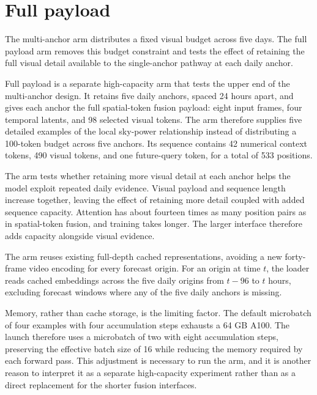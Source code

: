\section{Full payload}

The multi-anchor arm distributes a fixed visual budget across five days. The full payload arm removes this budget constraint and tests the effect of retaining the full visual detail available to the single-anchor pathway at each daily anchor.

Full payload is a separate high-capacity arm that tests the upper end of the multi-anchor design. It retains five daily anchors, spaced 24 hours apart, and gives each anchor the full spatial-token fusion payload: eight input frames, four temporal latents, and 98 selected visual tokens. The arm therefore supplies five detailed examples of the local sky-power relationship instead of distributing a 100-token budget across five anchors. Its sequence contains 42 numerical context tokens, 490 visual tokens, and one future-query token, for a total of 533 positions.

The arm tests whether retaining more visual detail at each anchor helps the model exploit repeated daily evidence. Visual payload and sequence length increase together, leaving the effect of retaining more detail coupled with added sequence capacity. Attention has about fourteen times as many position pairs as in spatial-token fusion, and training takes longer. The larger interface therefore adds capacity alongside visual evidence.

The arm reuses existing full-depth cached representations, avoiding a new forty-frame video encoding for every forecast origin. For an origin at time $t$, the loader reads cached embeddings across the five daily origins from $t-96$ to $t$ hours, excluding forecast windows where any of the five daily anchors is missing.

Memory, rather than cache storage, is the limiting factor. The default microbatch of four examples with four accumulation steps exhausts a 64 GB A100. The launch therefore uses a microbatch of two with eight accumulation steps, preserving the effective batch size of 16 while reducing the memory required by each forward pass. This adjustment is necessary to run the arm, and it is another reason to interpret it as a separate high-capacity experiment rather than as a direct replacement for the shorter fusion interfaces.
